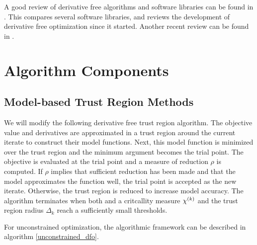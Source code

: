 A good review of derivative free algorithms and software libraries can be found in \cite{DUMMY:review}.
This compares several software libraries, and reviews the development of derivative free optimization since it started.
Another recent review can be found in \cite{DUMMY:review2}.



\section{Algorithm Components}


\subsection{Model-based Trust Region Methods}

We will modify the following derivative free trust region algorithm.
The objective value and derivatives are approximated in a trust region around the current iterate to construct their model functions.
Next, this model function is minimized over the trust region and the minimum argument becomes the trial point.
The objective is evaluated at the trial point and a measure of reduction $\rho$ is computed.
If $\rho$ implies that sufficient reduction has been made and that the model approximates the function well, the trial point is accepted as the new iterate.
Otherwise, the trust region is reduced to increase model accuracy.
The algorithm terminates when both and a critcallity measure ${\chi^{(k)}}$ and the trust region radius $\Delta_k$ reach a sufficiently small thresholds.


For unconstrained optimization, the algorithmic framework can be described in algorithm \ref{unconstrained_dfo}.

